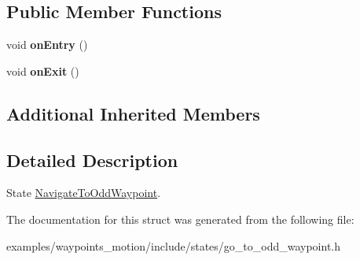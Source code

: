 \subsection*{Public Member Functions}
\begin{DoxyCompactItemize}
\item 
void {\bfseries on\+Entry} ()\hypertarget{structNavigateToOddWaypoint_1_1NavigateToOddWaypoint_a90a02cb4090f1274da0c101452afa87e}{}\label{structNavigateToOddWaypoint_1_1NavigateToOddWaypoint_a90a02cb4090f1274da0c101452afa87e}

\item 
void {\bfseries on\+Exit} ()\hypertarget{structNavigateToOddWaypoint_1_1NavigateToOddWaypoint_a6f4e1c3d45882b6bb75b4d4f9c1d2549}{}\label{structNavigateToOddWaypoint_1_1NavigateToOddWaypoint_a6f4e1c3d45882b6bb75b4d4f9c1d2549}

\end{DoxyCompactItemize}
\subsection*{Additional Inherited Members}


\subsection{Detailed Description}
State \hyperlink{structNavigateToOddWaypoint_1_1NavigateToOddWaypoint}{Navigate\+To\+Odd\+Waypoint}. 

The documentation for this struct was generated from the following file\+:\begin{DoxyCompactItemize}
\item 
examples/waypoints\+\_\+motion/include/states/go\+\_\+to\+\_\+odd\+\_\+waypoint.\+h\end{DoxyCompactItemize}
